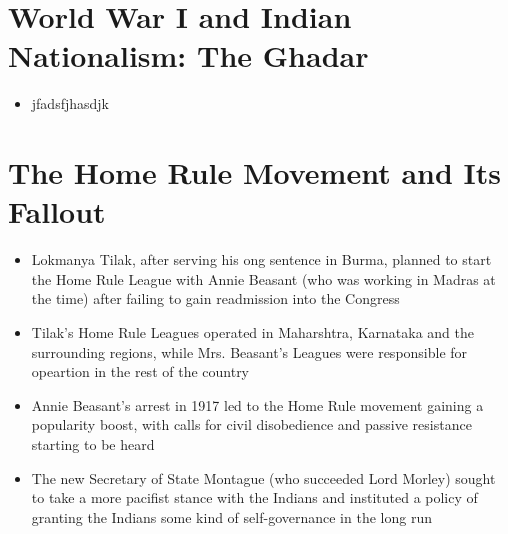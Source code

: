 \section{World War I and Indian Nationalism: The Ghadar}
\begin{itemize}
    \item jfadsfjhasdjk
\end{itemize}

\section{The Home Rule Movement and Its Fallout}
\begin{itemize}
    \item Lokmanya Tilak, after serving his ong sentence in Burma, planned to start the Home Rule League with Annie Beasant (who was working in Madras at the time) after failing to gain readmission into the Congress
    \item Tilak's Home Rule Leagues operated in Maharshtra, Karnataka and the surrounding regions, while Mrs. Beasant's Leagues were responsible for opeartion in the rest of the country
    \item Annie Beasant's arrest in 1917 led to the Home Rule movement gaining a popularity boost, with calls for civil disobedience and passive resistance starting to be heard
    \item The new Secretary of State Montague (who succeeded Lord Morley) sought to take a more pacifist stance with the Indians and instituted a policy of granting the Indians some kind of self-governance in the long run
\end{itemize}

